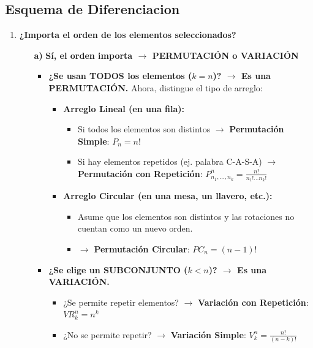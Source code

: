 \documentclass[12pt, letterpaper]{article}
\begin{document}
\subsection{Esquema de Diferenciacion}
\begin{enumerate}[label=\bfseries, wide]
	\item \textbf{¿Importa el orden de los elementos seleccionados?}
	      \begin{itemize}
		      \item[\bfseries a)] \textbf{Sí, el orden importa $\rightarrow$ PERMUTACIÓN o VARIACIÓN}
		            \begin{itemize}
			            \item \textbf{¿Se usan TODOS los elementos ($k=n$)? $\rightarrow$ Es una PERMUTACIÓN.}
			                  \noindent Ahora, distingue el tipo de arreglo:
			                  \begin{itemize}
				                  \item \textbf{Arreglo Lineal (en una fila):}
				                        \begin{itemize}
					                        \item Si todos los elementos son distintos $\rightarrow$ \textbf{Permutación Simple}:
					                              $ P_n = n! $
					                        \item Si hay elementos repetidos (ej. palabra C-A-S-A) $\rightarrow$ \textbf{Permutación con Repetición}:
					                              $ P_{n_1, \dots, n_k}^n = \frac{n!}{n_1! \dots n_k!} $
				                        \end{itemize}

				                  \item \textbf{Arreglo Circular (en una mesa, un llavero, etc.):}
				                        \begin{itemize}
					                        \item Asume que los elementos son distintos y las rotaciones no cuentan como un nuevo orden.
					                        \item $\rightarrow$ \textbf{Permutación Circular}: $ PC_n = (n-1)! $
				                        \end{itemize}
			                  \end{itemize}

			            \item \textbf{¿Se elige un SUBCONJUNTO ($k<n$)? $\rightarrow$ Es una VARIACIÓN.}
			                  \begin{itemize}
				                  \item ¿Se permite repetir elementos? $\rightarrow$ \textbf{Variación con Repetición}: $ VR_k^n = n^k $
				                  \item ¿No se permite repetir? $\rightarrow$ \textbf{Variación Simple}: $ V_k^n = \frac{n!}{(n-k)!} $
			                  \end{itemize}
		            \end{itemize}


\end{itemize}
\end{enumerate}
\end{document}
